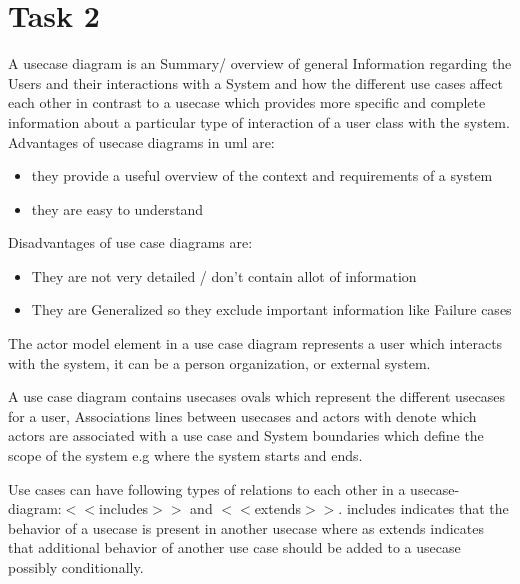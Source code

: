 \chapter{Task 2}
\begin{parlist}
\item A usecase diagram is an Summary/ overview of general Information regarding the Users and their interactions with a System and how the different use cases affect each other in contrast to a usecase which provides more specific and complete information about a particular type of interaction of a user class with the system.\cite{lucidchartCaseDiagramm}\\
Advantages of usecase diagrams in uml are:
\begin{itemize}
	\item  they provide a useful overview of the context and requirements of a system
	\item they are easy to understand
\end{itemize}
Disadvantages of use case diagrams are:
\begin{itemize}
	\item They are not very detailed / don't contain allot of information
	\item They are Generalized so they exclude important information like Failure cases
\end{itemize}
\item The actor model element in a use case diagram represents a user which interacts with the system, it can be a person organization, or external system.

\item A use case diagram contains usecases ovals which represent the different usecases for a user, Associations lines between usecases and actors with denote which actors are associated with a use case and System boundaries which define the scope of the system e.g where the system starts and ends.

\item Use cases can have following types of relations to each other in a usecase-diagram:$<<$includes$>>$
and $<<$extends$>>$. includes indicates that the behavior of a usecase is present in another usecase where as extends indicates that additional behavior of another use case should be added to a usecase possibly conditionally.

\end{parlist}
